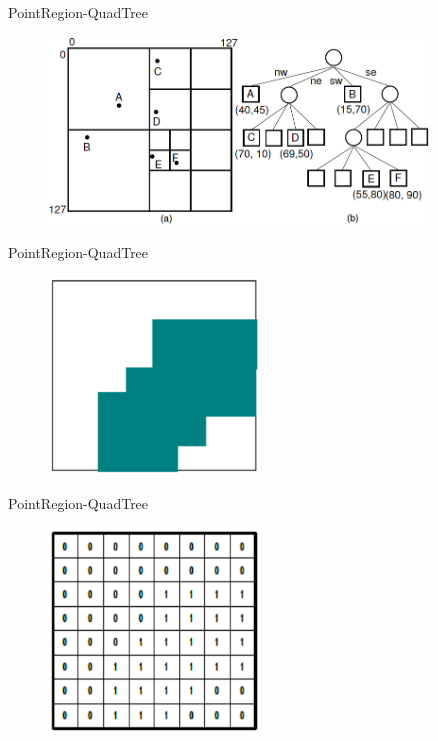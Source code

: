 \documentclass[red, tikz, aspectratio=169, xcolor=dvipsnames]{beamer}
\begin{document}
			\begin{frame}{PointRegion-QuadTree}
				\begin{figure}
					\centering
					\includegraphics[width=0.9\textwidth]{img/quad_tree_f.png}
				\end{figure}
			\end{frame}

			\begin{frame}{PointRegion-QuadTree}
				\begin{figure}
					\centering
					\includegraphics[width=0.5\textwidth]{img/pf_1.png}
				\end{figure}
			\end{frame}
			
			\begin{frame}{PointRegion-QuadTree}
				\begin{figure}
					\centering
					\includegraphics[width=0.5\textwidth]{img/pf_2.png}
				\end{figure}
			\end{frame}
			
\end{document}
